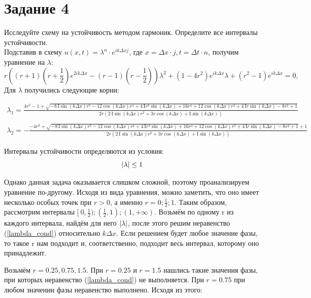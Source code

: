 \documentclass[a4paper, 14pt]{extreport}
\begin{document}
\section*{Задание 4}
Исследуйте схему на устойчивость методом гармоник. Определите все
интервалы устойчивости.\\
Подставив в схему $u(x,t) = \lambda^n\cdot e^{ik\Delta x j}$, где $x = \Delta x \cdot j, t = \Delta t \cdot n$, получим уравнение на $\lambda$:
\begin{equation}
	\label{lambda_eq}
	r((r+1)(r+\frac{1}{2})e^{2ik\Delta x} - (r-1)(r-\frac{1}{2}))\lambda^2 + (1-4r^2)e^{ik\Delta x}\lambda + (r^2-1)e^{ik\Delta x} = 0,
\end{equation}
Для $\lambda$ получились следующие корни:\\
\begin{scriptsize}
\begin{eqnarray}
\label{lambdas}
\lambda_1 = \frac{4 r^{2}-1+\sqrt{-8 \,\mathrm{I} \sin \! \left(k \Delta x  \right) r^{5}-12 \cos \! \left(k \Delta x  \right) r^{4}+4 \,\mathrm{I} r^{3} \sin \! \left(k \Delta x  \right)+16 r^{4}+12 \cos \! \left(k \Delta x  \right) r^{2}+4 \,\mathrm{I} r \sin \! \left(k \Delta x  \right)-8 r^{2}+1}}{2 r \left(2 \,\mathrm{I} \sin \! \left(k \Delta x  \right) r^{2}+3 r \cos \! \left(k \Delta x  \right)+\mathrm{I} \sin \! \left(k \Delta x  \right)\right)}
\\\nonumber\\\lambda_2 = -\frac{-4 r^{2}+\sqrt{-8 \,\mathrm{I} \sin \! \left(k \Delta x  \right) r^{5}-12 \cos \! \left(k \Delta x  \right) r^{4}+4 \,\mathrm{I} r^{3} \sin \! \left(k \Delta x  \right)+16 r^{4}+12 \cos \! \left(k \Delta x  \right) r^{2}+4 \,\mathrm{I} r \sin \! \left(k \Delta x  \right)-8 r^{2}+1}+1}{2 r \left(2 \,\mathrm{I} \sin \! \left(k \Delta x  \right) r^{2}+3 r \cos \! \left(k \Delta x  \right)+\mathrm{I} \sin \! \left(k \Delta x  \right)\right)}
\end{eqnarray}
\end{scriptsize}

\par Интервалы устойчивости определяются из условия:
\begin{equation}
	\label{lambda_cond}
	\abs{\lambda} \le 1
\end{equation}

\par Однако данная задача оказывается слишком сложной, поэтому проанализируем уравнение по-другому. Исходя из вида уравнения, можно заметить, что оно имеет несколько особых точек при $r > 0$, а именно $r = 0; \frac{1}{2}; 1$. Таким образом, рассмотрим интервалы $[\ 0, \frac{1}{2}); (\frac{1}{2}, 1); (1, +\infty)$. Возьмём по одному r из каждого интервала, найдём для него $\abs{\lambda}$, после этого решим неравенство (\ref{lambda_cond}) относительно $k\Delta x$. Если решением будет любое значение фазы, то такое r нам подходит и, соответственно, подходит весь интервал, которому оно принадлежит.
\par Возьмём $r = 0.25, 0.75, 1.5$. 
При $r = 0.25$ и $r = 1.5$ нашлись такие значения фазы, при которых неравенство (\ref{lambda_cond}) не выполняется. При $r = 0.75$ при любом значении фазы неравенство выполнено. Исходя из этого:
\end{document}
